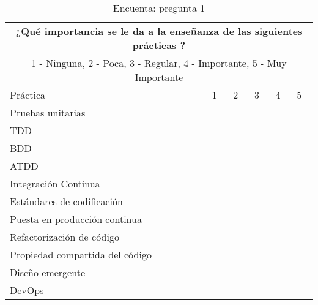 \begin{table}[h!]
\begin{tabular}{ |p{7cm}||p{1cm}|p{1cm}|p{1cm}|p{1cm}|p{1cm}|  }
 \toprule[1.5pt]
 \multicolumn{6}{|c|}{\textbf{¿Qué importancia se le da a la enseñanza de las siguientes prácticas ?}} \\
  \multicolumn{6}{|c|}{1 - Ninguna, 2 - Poca, 3 - Regular, 4 - Importante, 5 - Muy Importante} \\
\toprule[1.5pt]
Práctica & 1 & 2 & 3 & 4 & 5 \\
\toprule[1.5pt]
    Pruebas unitarias & & & & &\\
    \hline
    TDD & & & & & \\
    \hline
    BDD & & & & & \\
    \hline
    ATDD & & & & & \\
    \hline
    Integración Continua & & & & & \\
    \hline
    Estándares de codificación & & & & & \\
    \hline
    Puesta en producción continua & & & & & \\
    \hline
    Refactorización de código & & & & & \\
    \hline
    Propiedad compartida del código & & & & & \\
    \hline
    Diseño emergente & & & & & \\
    \hline
    DevOps & & & & & \\
 \hline
\end{tabular}
    \caption{Encuenta: pregunta 1}
\end{table}

